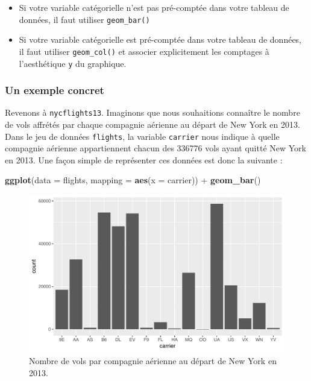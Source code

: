\documentclass[
  a4paper,
]{article}
\newenvironment{Shaded}{\begin{snugshade}}{\end{snugshade}}
\newcommand{\DataTypeTok}[1]{\textcolor[rgb]{0.00,0.34,0.68}{#1}}
\newcommand{\KeywordTok}[1]{\textcolor[rgb]{0.12,0.11,0.11}{\textbf{#1}}}
\newcommand{\NormalTok}[1]{\textcolor[rgb]{0.12,0.11,0.11}{#1}}
\newcommand{\OperatorTok}[1]{\textcolor[rgb]{0.12,0.11,0.11}{#1}}
\newcommand{\StringTok}[1]{\textcolor[rgb]{0.75,0.01,0.01}{#1}}
\providecommand{\tightlist}{%
  \setlength{\itemsep}{0pt}\setlength{\parskip}{0pt}}
\begin{document}
\begin{itemize}
\tightlist
\item
  Si votre variable catégorielle n'est pas pré-comptée dans votre tableau de données, il faut utiliser \texttt{geom\_bar()}
\item
  Si votre variable catégorielle est pré-comptée dans votre tableau de données, il faut utiliser \texttt{geom\_col()} et associer explicitement les comptages à l'aesthétique \texttt{y} du graphique.
\end{itemize}

\hypertarget{un-exemple-concret}{%
\subsubsection{Un exemple concret}\label{un-exemple-concret}}

Revenons à \texttt{nycflights13}. Imaginons que nous souhaitions connaître le nombre de vols affrétés par chaque compagnie aérienne au départ de New York en 2013. Dans le jeu de données \texttt{flights}, la variable \texttt{carrier} nous indique à quelle compagnie aérienne appartiennent chacun des 336776 vols ayant quitté New York en 2013. Une façon simple de représenter ces données est donc la suivante :

\begin{Shaded}
\begin{Highlighting}[]
\KeywordTok{ggplot}\NormalTok{(}\DataTypeTok{data =}\NormalTok{ flights, }\DataTypeTok{mapping =} \KeywordTok{aes}\NormalTok{(}\DataTypeTok{x =}\NormalTok{ carrier)) }\OperatorTok{+}
\StringTok{  }\KeywordTok{geom_bar}\NormalTok{()}
\end{Highlighting}
\end{Shaded}

\begin{figure}[htpb]

{\centering \includegraphics[width=0.9\linewidth]{figure/bpcarrier-1} 

}

\caption{Nombre de vols par compagnie aérienne au départ de New York en 2013.}\label{fig:bpcarrier}
\end{figure}
\end{document}
